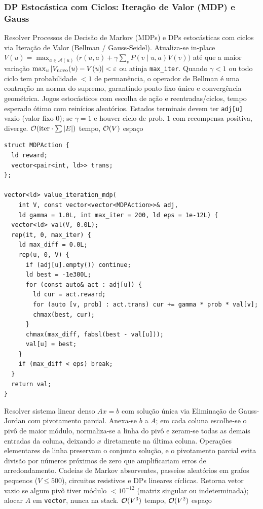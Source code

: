 \subsubsection{DP Estocástica com Ciclos: Iteração de Valor (MDP) e Gauss}
\algobox
  {Resolver Processos de Decisão de Markov (MDPs) e DPs estocásticas com ciclos via Iteração de Valor (Bellman / Gauss-Seidel).}
  {Atualiza-se in-place $V(u) = \max_{a \in \mathcal{A}(u)} \bigl( r(u, a) + \gamma \sum_v P(v \mid u, a) V(v) \bigr)$ até que a maior variação $\max_u |V_{\text{novo}}(u) - V(u)| < \varepsilon$ ou atinja \texttt{max\_iter}.}
  {Quando $\gamma < 1$ ou todo ciclo tem probabilidade $< 1$ de permanência, o operador de Bellman é uma contração na norma do supremo, garantindo ponto fixo único e convergência geométrica.}
  {Jogos estocásticos com escolha de ação e reentradas/ciclos, tempo esperado ótimo com reinícios aleatórios.}
  {Estados terminais devem ter \texttt{adj[u]} vazio (valor fixo $0$); se $\gamma = 1$ e houver ciclo de prob. $1$ com recompensa positiva, diverge.}
  {$\mathcal{O}(\text{iter} \cdot \sum |E|)$ tempo, $\mathcal{O}(V)$ espaço}

\begin{lstlisting}
struct MDPAction {
  ld reward;
  vector<pair<int, ld>> trans;
};

vector<ld> value_iteration_mdp(
    int V, const vector<vector<MDPAction>>& adj,
    ld gamma = 1.0L, int max_iter = 200, ld eps = 1e-12L) {
  vector<ld> val(V, 0.0L);
  rep(it, 0, max_iter) {
    ld max_diff = 0.0L;
    rep(u, 0, V) {
      if (adj[u].empty()) continue;
      ld best = -1e300L;
      for (const auto& act : adj[u]) {
        ld cur = act.reward;
        for (auto [v, prob] : act.trans) cur += gamma * prob * val[v];
        chmax(best, cur);
      }
      chmax(max_diff, fabsl(best - val[u]));
      val[u] = best;
    }
    if (max_diff < eps) break;
  }
  return val;
}
\end{lstlisting}

\algobox
  {Resolver sistema linear denso $Ax = b$ com solução única via Eliminação de Gauss-Jordan com pivotamento parcial.}
  {Anexa-se $b$ a $A$; em cada coluna escolhe-se o pivô de maior módulo, normaliza-se a linha do pivô e zeram-se todas as demais entradas da coluna, deixando $x$ diretamente na última coluna.}
  {Operações elementares de linha preservam o conjunto solução, e o pivotamento parcial evita divisão por números próximos de zero que amplificariam erros de arredondamento.}
  {Cadeias de Markov absorventes, passeios aleatórios em grafos pequenos ($V \le 500$), circuitos resistivos e DPs lineares cíclicas.}
  {Retorna vetor vazio se algum pivô tiver módulo $< 10^{-12}$ (matriz singular ou indeterminada); alocar $A$ em \texttt{vector}, nunca na stack.}
  {$\mathcal{O}(V^3)$ tempo, $\mathcal{O}(V^2)$ espaço}

